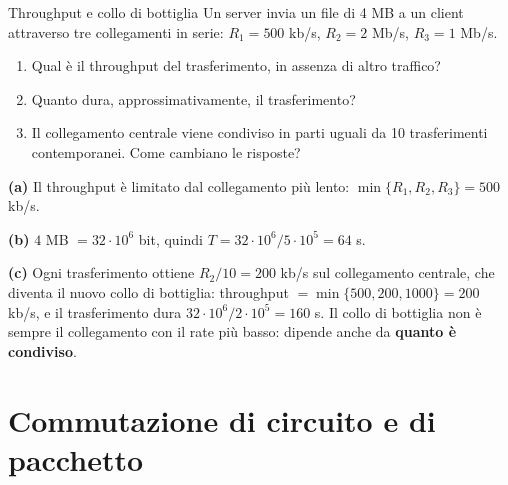 \begin{esercizio}{Throughput e collo di bottiglia}
Un server invia un file di 4 MB a un client attraverso tre collegamenti in serie: $R_1 = 500$ kb/s, $R_2 = 2$ Mb/s,
$R_3 = 1$ Mb/s.
\begin{enumerate}[label=(\alph*)]
    \item Qual è il throughput del trasferimento, in assenza di altro traffico?
    \item Quanto dura, approssimativamente, il trasferimento?
    \item Il collegamento centrale viene condiviso in parti uguali da 10 trasferimenti contemporanei. Come cambiano le risposte?
\end{enumerate}
\end{esercizio}

\svolgimento
\begin{center}
\end{center}

\textbf{(a)} Il throughput è limitato dal collegamento più lento: $\min\{R_1, R_2, R_3\} = 500$ kb/s.

\textbf{(b)} $4$ MB $= 32 \cdot 10^6$ bit, quindi $T = 32\cdot 10^6 / 5 \cdot 10^5 = 64$ s.

\textbf{(c)} Ogni trasferimento ottiene $R_2/10 = 200$ kb/s sul collegamento centrale, che diventa il nuovo collo di bottiglia:
throughput $= \min\{500, 200, 1000\} = 200$ kb/s, e il trasferimento dura $32\cdot 10^6 / 2\cdot 10^5 = 160$ s. Il collo di
bottiglia non è sempre il collegamento con il rate più basso: dipende anche da \textbf{quanto è condiviso}.

\section{Commutazione di circuito e di pacchetto}

